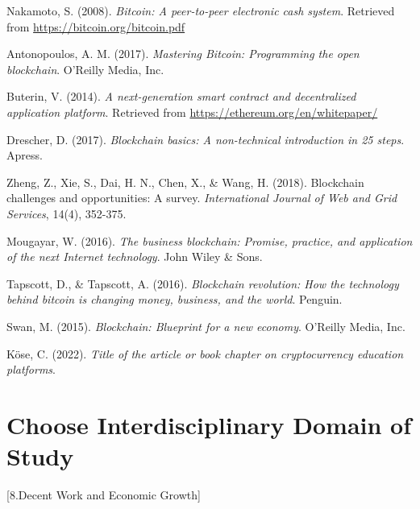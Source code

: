 \documentclass[12pt]{report}
\begin{document}
\begin{thebibliography}{9}
Nakamoto, S. (2008). \textit{Bitcoin: A peer-to-peer electronic cash system}. Retrieved from \url{https://bitcoin.org/bitcoin.pdf}

Antonopoulos, A. M. (2017). \textit{Mastering Bitcoin: Programming the open blockchain}. O'Reilly Media, Inc.

Buterin, V. (2014). \textit{A next-generation smart contract and decentralized application platform}. Retrieved from \url{https://ethereum.org/en/whitepaper/}

Drescher, D. (2017). \textit{Blockchain basics: A non-technical introduction in 25 steps}. Apress.

Zheng, Z., Xie, S., Dai, H. N., Chen, X., \& Wang, H. (2018). Blockchain challenges and opportunities: A survey. \textit{International Journal of Web and Grid Services}, 14(4), 352-375.

Mougayar, W. (2016). \textit{The business blockchain: Promise, practice, and application of the next Internet technology}. John Wiley \& Sons.

Tapscott, D., \& Tapscott, A. (2016). \textit{Blockchain revolution: How the technology behind bitcoin is changing money, business, and the world}. Penguin.

Swan, M. (2015). \textit{Blockchain: Blueprint for a new economy}. O'Reilly Media, Inc.


Köse, C. (2022). \textit{Title of the article or book chapter on cryptocurrency education platforms}. 

\end{thebibliography}




\section{Choose Interdisciplinary Domain of Study}
[8.Decent Work and Economic Growth]
\end{document}

